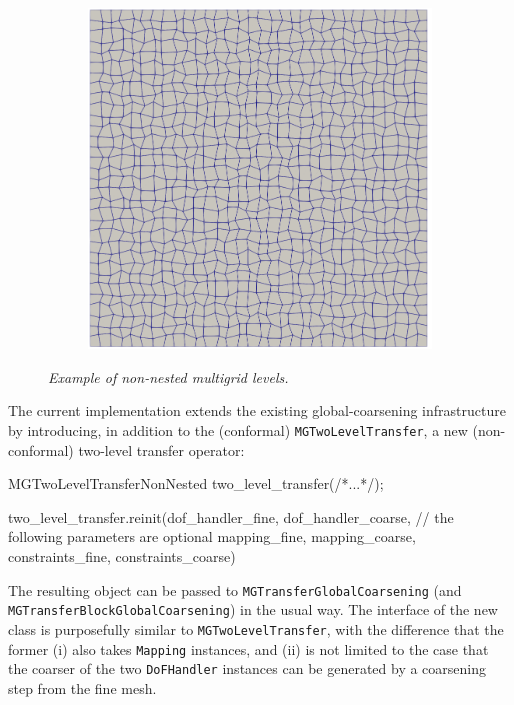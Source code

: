 \documentclass{ansarticle-preprint}
\begin{document}
\begin{figure}
\begin{subfigure}[b]{0.28\textwidth}
  \end{subfigure}
  \hfill
  \begin{subfigure}[b]{0.28\textwidth}
    \centering
    \includegraphics[width=\textwidth]{png/mesh_2.png}
  \end{subfigure}
  \caption{\it Example of non-nested multigrid levels.}\label{fig:nonnested}
\end{figure}

The current implementation extends the existing global-coarsening infrastructure by
introducing, in addition to the (conformal) \texttt{MGTwoLevelTransfer},
 a new (non-conformal) two-level transfer operator:
\begin{c++}
MGTwoLevelTransferNonNested two_level_transfer(/*...*/);

two_level_transfer.reinit(dof_handler_fine, dof_handler_coarse,
                          // the following parameters are optional
                          mapping_fine, mapping_coarse, 
                          constraints_fine, constraints_coarse)
\end{c++}
The resulting object can be passed to \texttt{MGTransferGlobalCoarsening} (and
\texttt{MGTransferBlockGlobalCoarsening}) in the usual way. The
interface of the new class is purposefully similar to
\texttt{MGTwoLevelTransfer},
with the difference that the former (i) also
takes \texttt{Mapping} instances, and (ii) is not limited to the case
that the coarser of the two \texttt{DoFHandler} instances can be generated by a coarsening step from the fine
mesh.
\end{document}
